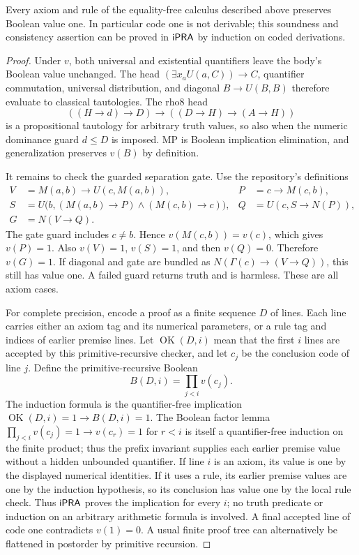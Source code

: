 \begin{theorem}
Every axiom and rule of the equality-free calculus described above preserves
Boolean value one. In particular code one is not derivable; this soundness
and consistency assertion can be proved in $\mathsf{iPRA}$ by induction on coded
derivations.
\end{theorem}
\begin{proof}
Under $v$, both universal and existential quantifiers leave the body's
Boolean value unchanged. The head $(\exists x_a U(a,C))\to C$, quantifier
commutation, universal distribution, and diagonal $B\to U(B,B)$ therefore
evaluate to classical tautologies. The rho8 head
\[
 ((H\to d)\to D)\to((D\to H)\to(A\to H))
\]
is a propositional tautology for arbitrary truth values, so also when the
numeric dominance guard $d\le D$ is imposed. MP is Boolean implication
elimination, and generalization preserves $v(B)$ by definition.

It remains to check the guarded separation gate. Use the repository's
definitions
\begin{align*}
 V&=M(a,b)\to U(c,M(a,b)),&
 P&=c\to M(c,b),\\
 S&=U\bigl(b,(M(a,b)\to P)\wedge(M(c,b)\to c)\bigr),&
 Q&=U(c,S\to N(P)),\\
 G&=N(V\to Q).
\end{align*}
The gate guard includes $c\ne b$. Hence $v(M(c,b))=v(c)$, which gives
$v(P)=1$. Also $v(V)=1$, $v(S)=1$, and then $v(Q)=0$.
Therefore $v(G)=1$. If diagonal and gate are bundled as
$N(\Gamma(c)\to(V\to Q))$, this still has value one.
A failed guard returns truth and is harmless. These are all axiom cases.

For complete precision, encode a proof as a finite sequence $D$ of lines.
Each line carries either an axiom tag and its numerical parameters, or a
rule tag and indices of earlier premise lines. Let $\operatorname{OK}(D,i)$
mean that the first $i$ lines are accepted by this primitive-recursive
checker, and let $c_j$ be the conclusion code of line $j$. Define the
primitive-recursive Boolean
\[
 B(D,i)=\prod_{j<i} v(c_j).
\]
The induction formula is the quantifier-free implication
$\operatorname{OK}(D,i)=1\to B(D,i)=1$.
The Boolean factor lemma
$\prod_{j<i}v(c_j)=1\to v(c_r)=1$ for $r<i$ is itself a
quantifier-free induction on the finite product; thus the prefix invariant
supplies each earlier premise value without a hidden unbounded quantifier.
If line $i$ is an axiom, its value is one by the displayed numerical
identities. If it uses a rule, its earlier premise values are one by the
induction hypothesis, so its conclusion has value one by the local rule
check. Thus $\mathsf{iPRA}$ proves the implication for every $i$; no truth predicate
or induction on an arbitrary arithmetic formula is involved. A final
accepted line of code one contradicts $v(1)=0$. A usual finite proof tree
can alternatively be flattened in postorder by primitive recursion.
\end{proof}

